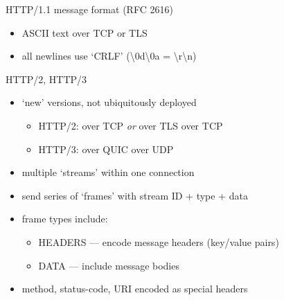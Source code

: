 \begin{frame}{HTTP/1.1 message format (RFC 2616)}
\begin{itemize}
\item ASCII text over TCP or TLS 
\item all newlines use `CRLF' (\textbackslash0d\textbackslash0a = \textbackslash r\textbackslash n)
\end{itemize}
\providecommand{\crlf}{\textit{\color{black!50}CRLF}}
\end{frame}

\begin{frame}{HTTP/2, HTTP/3}
    \begin{itemize}
    \item `new' versions, not ubiquitously deployed
        \begin{itemize}
        \item HTTP/2: over TCP \textit{or} over TLS over TCP
        \item HTTP/3: over QUIC over UDP
        \end{itemize}
    \vspace{.5cm}
    \item multiple `streams' within one connection 
    \item send series of `frames' with stream ID + type + data
    \item frame types include:
        \begin{itemize}
        \item HEADERS --- encode message headers (key/value pairs)
        \item DATA --- include message bodies
        \end{itemize}
    \item method, status-code, URI encoded as special headers
    \end{itemize}
\end{frame}

